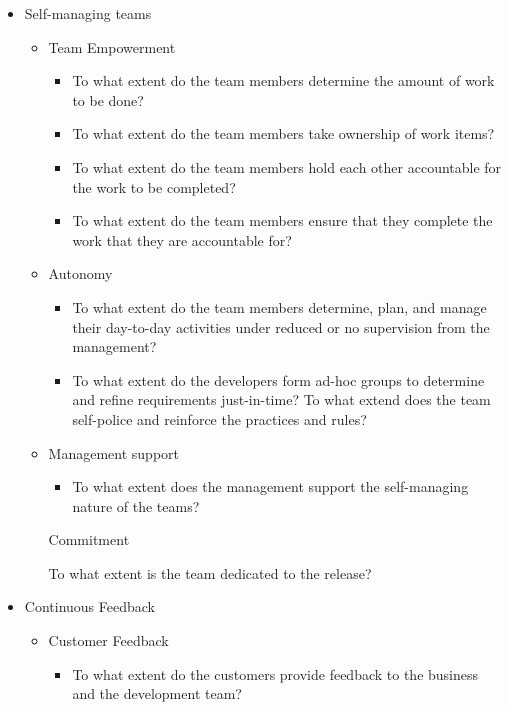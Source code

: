 \begin{itemize}
	\item Self-managing teams
		\begin{itemize}
			\item Team Empowerment
				\begin{itemize}
					\item To what extent do the team members determine the amount of work to be done? 
					\item To what extent do the team members take ownership of work items? 
					\item To what extent do the team members hold each other accountable for the work to be completed? 
					\item To what extent do the team members ensure that they complete the work that they are accountable for?
				\end{itemize}
			\item Autonomy
				\begin{itemize}
					\item To what extent do the team members determine, plan, and manage their day-to-day activities under reduced or no supervision from the management? 
					\item To what extent do the developers form ad-hoc groups to determine and refine requirements just-in-time?
					\addition To what extend does the team self-police and reinforce the practices and rules?
				\end{itemize}
			\item Management support
				\begin{itemize}
					\item To what extent does the management support the self-managing nature of the teams?
				\end{itemize}
			\indicatorAddition Commitment
				\begin{itemize}
					\addition To what extent is the team dedicated to the release?
				\end{itemize}
		\end{itemize}
	\item Continuous Feedback	
		\begin{itemize}
			\item Customer Feedback
				\begin{itemize}
					\item To what extent do the customers provide feedback to the business and the development team?

\end{itemize}
\end{itemize}
\end{itemize}
